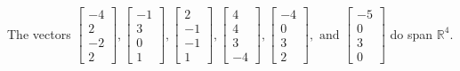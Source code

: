 \begin{exercise}
\begin{exerciseStatement}
  \end{exerciseStatement}
  \begin{exerciseAnswer}
   The vectors \(\left[\begin{array}{r}
-4 \\
2 \\
-2 \\
2
\end{array}\right] , \left[\begin{array}{r}
-1 \\
3 \\
0 \\
1
\end{array}\right] , \left[\begin{array}{r}
2 \\
-1 \\
-1 \\
1
\end{array}\right] , \left[\begin{array}{r}
4 \\
4 \\
3 \\
-4
\end{array}\right] , \left[\begin{array}{r}
-4 \\
0 \\
3 \\
2
\end{array}\right] , \text{ and } \left[\begin{array}{r}
-5 \\
0 \\
3 \\
0
\end{array}\right]\) 
  	 do  
	span \(\mathbb{R}^4\).
  


  \end{exerciseAnswer}
\end{exercise}